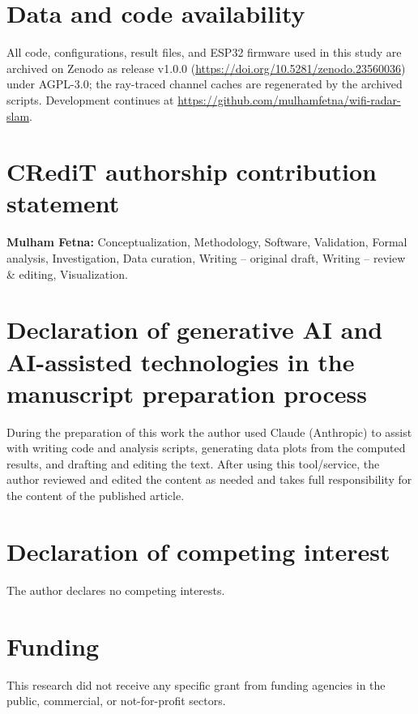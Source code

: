 \documentclass[preprint,12pt]{elsarticle}
\begin{document}
\section*{Data and code availability}
All code, configurations, result files, and ESP32 firmware used in this study are archived on
Zenodo as release v1.0.0 \cite{fetna2026zenodo} (\url{https://doi.org/10.5281/zenodo.23560036})
under AGPL-3.0; the ray-traced channel caches are regenerated by the archived scripts. Development
continues at \url{https://github.com/mulhamfetna/wifi-radar-slam}.

\section*{CRediT authorship contribution statement}
\textbf{Mulham Fetna:} Conceptualization, Methodology, Software, Validation, Formal analysis,
Investigation, Data curation, Writing -- original draft, Writing -- review \& editing,
Visualization.

\section*{Declaration of generative AI and AI-assisted technologies in the manuscript preparation process}
During the preparation of this work the author used Claude (Anthropic) to assist with writing
code and analysis scripts, generating data plots from the computed results, and drafting and
editing the text. After using this tool/service, the author reviewed and edited the content as
needed and takes full responsibility for the content of the published article.

\section*{Declaration of competing interest}
The author declares no competing interests.

\section*{Funding}
This research did not receive any specific grant from funding agencies in the public,
commercial, or not-for-profit sectors.



\end{document}
